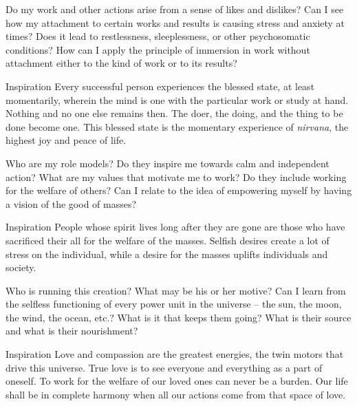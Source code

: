 \newpage
\begin{mananam}{} 
\mananamtext Do my work and other actions arise from a sense of likes and dislikes? Can I see how my attachment to certain works and results is causing stress and anxiety at times? Does it lead to restlessness, sleeplessness, or other psychosomatic conditions? How can I apply the principle of immersion in work without attachment either to the kind of work or to its results?
\end{mananam}
\WritingHand{}
\begin{inspiration}{\mananamfont Inspiration}
\mananamtext Every successful person experiences the blessed state, at least momentarily, wherein the mind is one with the particular work or study at hand. Nothing and no one else remains then. The doer, the doing, and the thing to be done become one. This blessed state is the momentary experience of \emph{nirvana}, the highest joy and peace of life.
\end{inspiration}
\newpage


\newpage
\begin{mananam}{} 
\mananamtext Who are my role models? Do they inspire me towards calm and independent action? What are my values that motivate me to work? Do they include working for the welfare of others? Can I relate to the idea of empowering myself by having a vision of the good of masses?
\end{mananam}
\WritingHand{}
\begin{inspiration}{\mananamfont Inspiration}
\mananamtext People whose spirit lives long after they are gone are those who have sacrificed their all for the welfare of the masses. Selfish desires create a lot of stress on the individual, while a desire for the masses uplifts individuals and society.
\end{inspiration}
\newpage


\newpage
\begin{mananam}{} 
\mananamtext Who is running this creation? What may be his or her motive? Can I learn from the selfless functioning of every power unit in the universe – the sun, the moon, the wind, the ocean, etc.? What is it that keeps them going? What is their source and what is their nourishment? 
\end{mananam}
\WritingHand{}
\begin{inspiration}{\mananamfont Inspiration}
\mananamtext Love and compassion are the greatest energies, the twin motors that drive this universe. True love is to see everyone and everything as a part of oneself. To work for the welfare of our loved ones can never be a burden. Our life shall be in complete harmony when all our actions come from that space of love.
\end{inspiration}
\newpage

